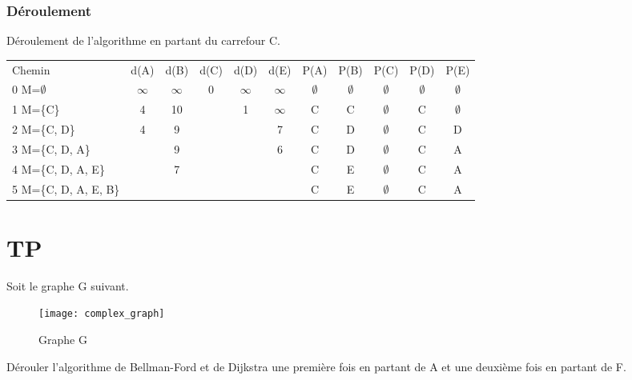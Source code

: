 \documentclass[11pt]{extarticle}
\begin{document}
\subsubsection{Déroulement}
Déroulement de l'algorithme en partant du carrefour C.\\
\begin{center}
\begin{tabular*}{0.95\textwidth}{|l|c|c|c|c|c||c|c|c|c|c|}
 \rowcolor{light_green} Chemin & d(A) & d(B) & d(C) & d(D) & d(E) & P(A)& P(B)& P(C)& P(D)& P(E) \\
  \rowcolor{light_green2} 0 M=$\emptyset$ & $\infty$ & $\infty$ & 0 & $\infty$ & $\infty$ & $\emptyset$ & $\emptyset$ & $\emptyset$ & $\emptyset$ & $\emptyset$ \\
   \rowcolor{light_green2} 1 M=\{C\} & 4 & 10 &  & \cellcolor{yellow} 1 & $\infty$ & C & C & $\emptyset$ & C & $\emptyset$ \\
\rowcolor{light_green2} 2 M=\{C, D\} & \cellcolor{yellow} 4 & 9 &  &  & 7 & C & D & $\emptyset$ & C & D \\
\rowcolor{light_green2} 3 M=\{C, D, A\} & & 9 & & & \cellcolor{yellow} 6 & C & D & $\emptyset$ & C & A \\
 \rowcolor{light_green2} 4 M=\{C, D, A, E\} &  & \cellcolor{yellow} 7 &  &  &  & C & E & $\emptyset$ & C & A \\
 \rowcolor{light_green2} 5 M=\{C, D, A, E, B\} &  &  &  &  &  & C & E & $\emptyset$ & C & A \\
 \end{tabular*}
\end{center}
\section{TP}
\noindent
Soit le graphe G suivant.\\
\begin{figure}[H]
\begin{center}
\texttt{[image: complex\_graph]}
\caption{Graphe G}
\end{center}
\end{figure}
Dérouler l'algorithme de Bellman-Ford et de Dijkstra une première fois en partant de A et une deuxième fois en partant de F.
\end{document}
